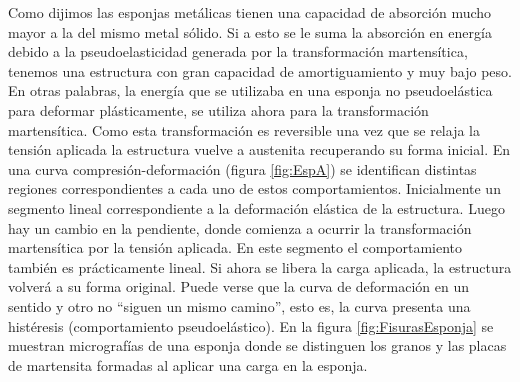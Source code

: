 \documentclass[a4paper,12pt,fleqn,twoside,openany]{book}
\begin{document}
Como dijimos las esponjas metálicas tienen una capacidad de absorción mucho mayor a la del mismo metal sólido. Si a esto se le suma la absorción en energía 
debido a la pseudoelasticidad generada por la transformación martensítica, tenemos una estructura con gran capacidad de amortiguamiento y muy bajo 
peso. En otras palabras, la energía que se utilizaba en una esponja no pseudoelástica para deformar plásticamente, se utiliza ahora para la transformación
martensítica. Como esta transformación es reversible una vez que se relaja la tensión aplicada la estructura vuelve a austenita recuperando su forma 
inicial. En una curva compresión-deformación (figura \ref{fig:EspA}) se identifican distintas regiones correspondientes a cada uno de estos comportamientos. Inicialmente un 
segmento lineal correspondiente a la deformación elástica de la estructura. Luego hay un cambio en la pendiente, donde comienza a ocurrir 
la transformación martensítica por la tensión aplicada. En este segmento el comportamiento también es prácticamente lineal. Si ahora se libera la carga 
aplicada, la estructura volverá a su forma original. Puede verse que la curva de deformación en un sentido y otro no “siguen un mismo camino”, esto es, 
la curva presenta una histéresis (comportamiento pseudoelástico). En la figura \ref{fig:FisurasEsponja} se muestran micrografías de una esponja donde se distinguen los granos y las placas de martensita formadas al aplicar una carga en la esponja.
\end{document}
